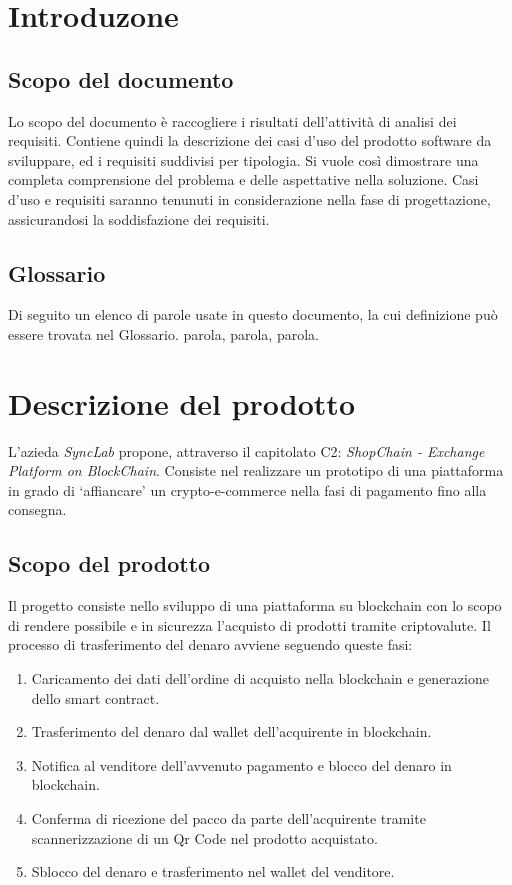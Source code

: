 \documentclass[a4paper, 12pt]{article}
\begin{document}
\makefrontpage

\makeversioni

\section{Introduzone}
\subsection{Scopo del documento}
Lo scopo del documento è raccogliere i risultati dell'attività di analisi dei requisiti. Contiene quindi la descrizione dei casi d'uso del prodotto software da sviluppare, ed i requisiti suddivisi per tipologia. Si vuole così dimostrare una completa comprensione del problema e delle aspettative  nella soluzione. Casi d'uso e requisiti saranno tenunuti in considerazione nella fase di progettazione, assicurandosi la soddisfazione dei requisiti. 
\subsection{Glossario}
Di seguito un elenco di parole usate in questo documento, la cui definizione può essere trovata nel Glossario.
parola, parola, parola.

\section{Descrizione del prodotto}
L'azieda \textit{SyncLab} propone, attraverso il capitolato C2: \textit{ShopChain - Exchange Platform on
BlockChain}. Consiste nel realizzare un prototipo di una piattaforma in grado di ‘affiancare’ un crypto-e-commerce nella fasi di pagamento fino alla consegna.
\subsection{Scopo del prodotto}
Il progetto consiste nello sviluppo di una piattaforma su blockchain con lo scopo di rendere possibile e in sicurezza l'acquisto di prodotti tramite criptovalute. Il processo di trasferimento del denaro avviene seguendo queste fasi:
\begin{enumerate}
\item Caricamento dei dati dell'ordine di acquisto nella blockchain e generazione dello smart contract.
\item Trasferimento del denaro dal wallet dell'acquirente in blockchain.
\item Notifica al venditore dell'avvenuto pagamento e blocco del denaro in blockchain.
\item Conferma di ricezione del pacco da parte dell'acquirente tramite scannerizzazione di un Qr Code nel prodotto acquistato.
\item Sblocco del denaro e trasferimento nel wallet del venditore.
\end{enumerate}
\end{document}
